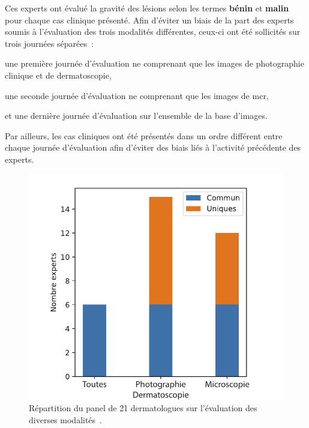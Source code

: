 Ces experts ont évalué la gravité des lésions selon les termes \textbf{bénin} et \textbf{malin} pour chaque cas clinique présenté. Afin d'éviter un biais de la part des experts soumis à l'évaluation des trois modalités différentes, ceux-ci ont été sollicités sur trois journées séparées~:
\begin{inlinerate}
    \item une première journée d'évaluation ne comprenant que les images de photographie clinique et de dermatoscopie,
    \item une seconde journée d'évaluation ne comprenant que les images de \gls{mcr},
    \item et une dernière journée d'évaluation sur l'ensemble de la base d'images.
\end{inlinerate}
Par ailleurs, les cas cliniques ont été présentés dans un ordre différent entre chaque journée d'évaluation afin d'éviter des biais liés à l'activité précédente des experts.\par

\begin{figure}[H]
    \centering
    \includegraphics[width=0.75\linewidth]{contents/chapter_4/resources/experts_evaluation.pdf}
    \caption{Répartition du panel de 21 dermatologues sur l'évaluation des diverses modalités~\cite{Cinotti2018}.}
    \label{fig:experts_evaluation}
\end{figure}\par
\clearpage

